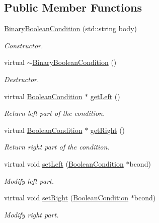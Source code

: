 \subsection*{Public Member Functions}
\begin{DoxyCompactItemize}
\item 
\hyperlink{class_binary_boolean_condition_aaa28d7eee48ae1fa96944310a715962c}{Binary\-Boolean\-Condition} (std\-::string body)
\begin{DoxyCompactList}\small\item\em Constructor. \end{DoxyCompactList}\item 
\hypertarget{class_binary_boolean_condition_aa54534f1033d6cc84591a1dac7a99e76}{virtual \hyperlink{class_binary_boolean_condition_aa54534f1033d6cc84591a1dac7a99e76}{$\sim$\-Binary\-Boolean\-Condition} ()}\label{class_binary_boolean_condition_aa54534f1033d6cc84591a1dac7a99e76}

\begin{DoxyCompactList}\small\item\em Destructor. \end{DoxyCompactList}\item 
virtual \hyperlink{class_boolean_condition}{Boolean\-Condition} $\ast$ \hyperlink{class_binary_boolean_condition_ada259076d258bd3b7a50a66c42850923}{get\-Left} ()
\begin{DoxyCompactList}\small\item\em Return left part of the condition. \end{DoxyCompactList}\item 
virtual \hyperlink{class_boolean_condition}{Boolean\-Condition} $\ast$ \hyperlink{class_binary_boolean_condition_a5a35cf6749d7a7408fbef2b7229b53b3}{get\-Right} ()
\begin{DoxyCompactList}\small\item\em Return right part of the condition. \end{DoxyCompactList}\item 
virtual void \hyperlink{class_binary_boolean_condition_a3b7bc5b83b6ae0036bc14aae0f649b2f}{set\-Left} (\hyperlink{class_boolean_condition}{Boolean\-Condition} $\ast$bcond)
\begin{DoxyCompactList}\small\item\em Modify left part. \end{DoxyCompactList}\item 
virtual void \hyperlink{class_binary_boolean_condition_ad6902b875aca001608438fbc7e3143ff}{set\-Right} (\hyperlink{class_boolean_condition}{Boolean\-Condition} $\ast$bcond)
\begin{DoxyCompactList}\small\item\em Modify right part. \end{DoxyCompactList}\end{DoxyCompactItemize}

